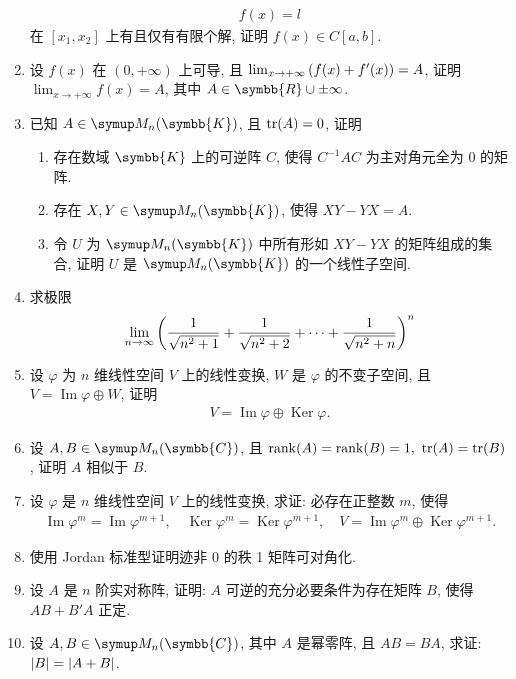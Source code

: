\documentclass{ctexart}
\newcommand{\limit}[2]{\lim_{#1 \to #2}}
\newcommand{\R}{\ensuremath{\symbb{R}}}
\newcommand{\K}{\ensuremath{\symbb{K}}}
\newcommand{\C}{\ensuremath{\symbb{C}}}
\DeclareMathOperator{\Image}{Im}
\DeclareMathOperator{\Ker}{Ker}
\begin{document}
\begin{enumerate}[series=exer]
    \begin{align*}
        f(x) = l
    \end{align*}
    在 $ [x_{1}, x_{2}] $ 上有且仅有有限个解, 证明 $ f(x) \in C[a, b] $.
    \item 设 $ f(x) $ 在 $ (0, +\infty) $ 上可导, 且 $ \limit{x}{+\infty} \qty(f(x) + f'(x)) = A $, 证明 $ \limit{x}{+\infty} f(x) = A $, 其中 $ A \in \R\cup{\pm\infty} $. 
    \item 已知 $ A \in \MM[\K] $, 且 $ \tr(A) = 0 $, 证明
    \begin{enumerate}
        \item 存在数域 $ \K $ 上的可逆阵 $ C $, 使得 $ C^{-1}AC $ 为主对角元全为 $ 0 $ 的矩阵.
        \item 存在 $ X, Y \in \MM[\K] $, 使得 $ XY - YX = A $.
        \item 令 $ U $ 为 $ \MM[\K] $ 中所有形如 $ XY - YX $ 的矩阵组成的集合, 证明 $ U $ 是 $ \MM[\K] $ 的一个线性子空间. 
    \end{enumerate}
    \item 求极限
    \begin{align*}
        \limit{n}{\infty} \qty(\frac{1}{\sqrt{n^{2} + 1}} + \frac{1}{\sqrt{n^{2} + 2}} + \dots + \frac{1}{\sqrt{n^{2} + n}})^{n}
    \end{align*}
    \item 设 $ \varphi $ 为 $ n $ 维线性空间 $ V $ 上的线性变换, $ W $ 是 $ \varphi $ 的不变子空间, 且 $ V = \Image \varphi \oplus W $, 证明
    \begin{align*}
        V = \Image \varphi \oplus \Ker \varphi.
    \end{align*}
    \item 设 $ A, B \in \MM[\C] $, 且 $ \rank(A) = \rank(B)  = 1,\ \tr(A) = \tr(B) $, 证明 $ A $ 相似于 $ B $.
    \item 设 $ \varphi $ 是 $ n $ 维线性空间 $ V $ 上的线性变换, 求证: 必存在正整数 $ m $, 使得
    \begin{align*}
        \Image \varphi^{m} = \Image \varphi^{m+1},\quad \Ker \varphi^{m} = \Ker \varphi^{m+1}, \quad V = \Image \varphi^{m} \oplus \Ker \varphi^{m+1}.
    \end{align*}
    \item 使用 Jordan 标准型证明迹非 $ 0 $ 的秩 1 矩阵可对角化.
    \item 设 $ A $ 是 $ n $ 阶实对称阵, 证明: $ A $ 可逆的充分必要条件为存在矩阵 $ B $, 使得 $ AB + B'A $ 正定.
    \item 设 $ A, B \in \MM[\C] $, 其中 $ A $ 是幂零阵, 且 $ AB = BA $, 求证: $ \abs{B} = \abs{A + B} $. 

\end{enumerate}
\end{document}
